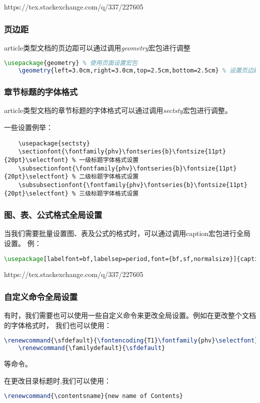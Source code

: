 \begin{tcolorbox}[colback=red!5!white, colframe=red!50!black,
        title=How to change certain pages into landscape/portrait mode]
    https://tex.stackexchange.com/q/337/227605
\end{tcolorbox}

\subsubsection{页边距}
article类型文档的页边距可以通过调用\emph{geometry}宏包进行调整
\begin{lstlisting}[language=TeX]
    \usepackage{geometry} % 使用页面设置宏包
    \geometry{left=3.0cm,right=3.0cm,top=2.5cm,bottom=2.5cm} % 设置页边距
\end{lstlisting}

\subsubsection{章节标题的字体格式}
article类型文档的章节标题的字体格式可以通过调用\emph{sectsty}宏包进行调整。

一些设置例举：
\begin{lstlisting}
    \usepackage{sectsty}
    \sectionfont{\fontfamily{phv}\fontseries{b}\fontsize{11pt}{20pt}\selectfont} % 一级标题字体格式设置
    \subsectionfont{\fontfamily{phv}\fontseries{b}\fontsize{11pt}{20pt}\selectfont} % 二级标题字体格式设置
    \subsubsectionfont{\fontfamily{phv}\fontseries{b}\fontsize{11pt}{20pt}\selectfont} % 三级标题字体格式设置
\end{lstlisting}

\subsubsection{图、表、公式格式全局设置}
当我们需要批量设置图、表及公式的格式时，可以通过调用caption宏包进行全局设置。
例：
\begin{lstlisting}[language=TeX]
    \usepackage[labelfont=bf,labelsep=period,font={bf,sf,normalsize}]{caption}
\end{lstlisting}

\begin{tcolorbox}[colback=red!5!white, colframe=red!50!black,
        title=Changing/Defining Fonts for an Entire Document]
    https://tex.stackexchange.com/q/337/227605
\end{tcolorbox}

\subsubsection{自定义命令全局设置}
有时，我们需要也可以使用一些自定义命令来更改全局设置。例如在更改整个文档的字体格式时，
我们也可以使用：
\begin{lstlisting}[language=TeX]
    \renewcommand{\sfdefault}{\fontencoding{T1}\fontfamily{phv}\selectfont}
    \renewcommand{\familydefault}{\sfdefault}
\end{lstlisting}
等命令。

在更改目录标题时,我们可以使用：
\begin{lstlisting}[language=TeX]
    \renewcommand{\contentsname}{new name of Contents}
\end{lstlisting}